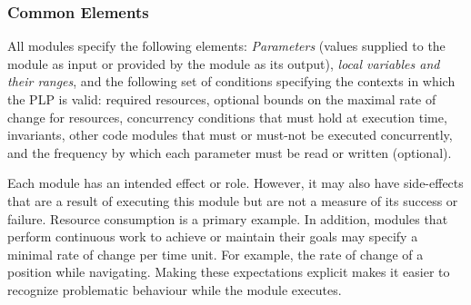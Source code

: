 \documentclass[letterpaper]{article}
\newcommand\commentout[1]{}
\begin{document}
\commentout{
The formal definition of PLPs rests on the specification of properties of states of the world. 
These are defined by specifying properties of various state variables.
%
In addition, each module may need access to certain resources. These resources could be energy or memory, some actuator, or some region of space. These must be specified, much like state variables, and coherent and consistent use of these names is required. In fact, resources can be viewed as a special class of state variables, whose state indicates the status of the resource (e.g., available, $> 100$ gallons, etc.). 
However, because they carry special significance to programmers and operators, we distinguish them from other variables. 

}

\subsubsection{Common Elements}
All modules specify the following elements:
 {\em Parameters} (values supplied to the module as input or provided by the module as its output),
{\em local variables and their ranges}, and the following set of conditions specifying the contexts in which the PLP is valid:
required resources, optional bounds on the maximal rate of change for resources, concurrency conditions that must hold
at execution time, invariants, other code modules that must or must-not be executed concurrently, 
and the frequency by which each parameter must be read or written (optional).

Each module has an intended effect or role. However, it may also have side-effects that are a result of executing this module but are not a measure of its success or failure.  Resource consumption is a primary example.  In addition,
modules that perform continuous work to achieve or maintain their goals may specify a minimal rate of change per time unit.
For example, the rate of change of a position while navigating.
Making these expectations explicit makes it easier to recognize problematic behaviour while the module executes.
\end{document}
